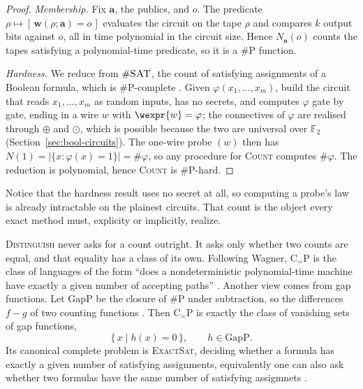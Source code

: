   \begin{proof}
  \emph{Membership.} Fix $\mathbf{a}$, the publics, and $o$. The predicate
  $\rho \mapsto [\, \mathbf{w}(\rho; \mathbf{a}) = o \,]$ evaluates the circuit on the tape
  $\rho$ and compares $k$ output bits against $o$, all in time polynomial in the
  circuit size. Hence $N_{\mathbf{a}}(o)$ counts the tapes satisfying a
  polynomial-time predicate, so it is a $\#\mathrm{P}$ function.

  \emph{Hardness.} We reduce from $\#\textsc{SAT}$, the count of satisfying
  assignments of a Boolean formula, which is $\#\mathrm{P}$-complete
  \parencite{valiant1979complexity}. Given $\varphi(x_1, \dots, x_m)$, build the
  circuit that reads $x_1, \dots, x_m$ as random inputs, has no secrets, and
  computes $\varphi$ gate by gate, ending in a wire $w$ with $\wexpr{w} = \varphi$;
  the connectives of $\varphi$ are realised
  through $\oplus$ and $\odot$, which is possible because the two are universal over
  $\mathbb{F}_2$ (Section~\ref{sec:bool-circuits}). The one-wire probe $(w)$ then has
  $N(1) = |\{ x : \varphi(x) = 1 \}| = \#\varphi$, so any procedure for
  \textsc{Count} computes $\#\varphi$. The reduction is polynomial, hence
  \textsc{Count} is $\#\mathrm{P}$-hard.
  \end{proof}

  Notice that the hardness result uses no secret at all, so computing a probe's law is already
  intractable on the plainest circuits. That count is the object every exact method
  must, explicity or implicitly, realize.

  \label{sec:ceqp}

  \textsc{Distinguish} never asks for a count outright. It asks only whether two
  counts are equal, and that equality has a class of its own. Following Wagner,
  $\mathrm{C}_{=}\mathrm{P}$ is the class of languages of the form ``does a
  nondeterministic polynomial-time machine have exactly a given number of
  accepting paths'' \parencite{wagner1986complexity}. Another view comes
  from gap functions. Let $\mathrm{GapP}$ be the closure of $\#\mathrm{P}$ under
  subtraction, so the differences $f - g$ of two counting functions
  \parencite{fenner1994gap}. Then $\mathrm{C}_{=}\mathrm{P}$ is exactly the class of
  vanishing sets of gap functions,
  \[
    \big\{\, x \mid h(x) = 0 \,\big\}, \qquad h \in \mathrm{GapP} .
  \]
  Its canonical complete problem is \textsc{ExactSat}, deciding whether a formula
  has exactly a given number of satisfying assignments, equivalently one can also
  ask whether two formulas have the same number of satisfying assigmnets
  \parencite{wagner1986complexity}.

